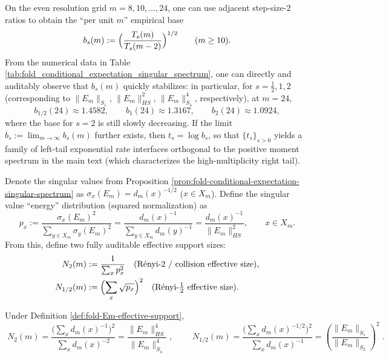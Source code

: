 \begin{remark}\label{rem:fold-negative-moment-free-energy-bases}
On the even resolution grid \(m=8,10,\dots,24\), one can use adjacent step-size-\(2\) ratios to obtain the ``per unit \(m\)'' empirical base
\[
b_s(m):=\Bigl(\frac{T_s(m)}{T_s(m-2)}\Bigr)^{1/2}\qquad(m\ge 10).
\]
From the numerical data in Table \ref{tab:fold_conditional_expectation_singular_spectrum}, one can directly and auditably observe that \(b_s(m)\) quickly stabilizes:
in particular, for \(s=\tfrac12,1,2\) (corresponding to \(\|E_m\|_{S_1}\), \(\|E_m\|_{HS}^2\), \(\|E_m\|_{S_4}^4\), respectively), at \(m=24\),
\[
b_{1/2}(24)\approx 1.4582,\qquad
b_{1}(24)\approx 1.3167,\qquad
b_{2}(24)\approx 1.0924,
\]
where the base for \(s=2\) is still slowly decreasing.
If the limit \(b_s:=\lim_{m\to\infty}b_s(m)\) further exists, then \(t_s=\log b_s\), so that \(\{t_s\}_{s>0}\) yields a family of left-tail exponential rate interfaces orthogonal to the positive moment spectrum in the main text (which characterizes the high-multiplicity right tail).
\end{remark}



\begin{definition}\label{def:fold-Em-effective-support}
Denote the singular values from Proposition \ref{prop:fold-conditional-expectation-singular-spectrum} as
\(\sigma_x(E_m)=d_m(x)^{-1/2}\) (\(x\in X_m\)).
Define the singular value ``energy'' distribution (squared normalization) as
\[
p_x:=\frac{\sigma_x(E_m)^2}{\sum_{y\in X_m}\sigma_y(E_m)^2}
=\frac{d_m(x)^{-1}}{\sum_{y\in X_m}d_m(y)^{-1}}
=\frac{d_m(x)^{-1}}{\|E_m\|_{HS}^2},
\qquad x\in X_m.
\]
From this, define two fully auditable effective support sizes:
\[
\begin{aligned}
N_2(m)&:=\frac{1}{\sum_x p_x^2}
\quad(\text{R\'enyi-2 / collision effective size}),\\
N_{1/2}(m)&:=\Bigl(\sum_x\sqrt{p_x}\Bigr)^2
\quad(\text{R\'enyi-}\tfrac12\text{ effective size}).
\end{aligned}
\]
\end{definition}

\begin{proposition}\label{prop:fold-Em-effective-support-schatten}
Under Definition \ref{def:fold-Em-effective-support},
\[
\boxed{\;
N_2(m)=\frac{\bigl(\sum_x d_m(x)^{-1}\bigr)^2}{\sum_x d_m(x)^{-2}}
=\frac{\|E_m\|_{HS}^4}{\|E_m\|_{S_4}^4}\;},
\qquad
\boxed{\;
N_{1/2}(m)=\frac{\bigl(\sum_x d_m(x)^{-1/2}\bigr)^2}{\sum_x d_m(x)^{-1}}
=\left(\frac{\|E_m\|_{S_1}}{\|E_m\|_{S_2}}\right)^2\;}.
\]
\end{proposition}

